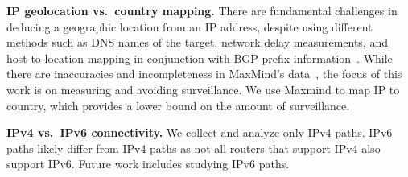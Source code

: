 \textbf{IP geolocation vs.\ country mapping.}
There are fundamental challenges in deducing a geographic location
from an IP address, 
despite using different methods such as DNS names of the target,
network delay measurements, and host-to-location mapping in
conjunction with BGP prefix
information~\cite{padmanabhan2001investigation}.  While there are
inaccuracies and incompleteness in MaxMind's
data~\cite{huffaker2011geocompare}, the focus of this work is on
measuring and avoiding surveillance.  We use Maxmind to map IP to
country,
which provides a lower
bound on the amount of surveillance.

\textbf{IPv4 vs.\ IPv6 connectivity.}
We collect and analyze only IPv4 paths.  IPv6 paths likely
differ from IPv4 paths as not all routers that support IPv4 also support
IPv6.  Future work includes studying IPv6 paths.  


